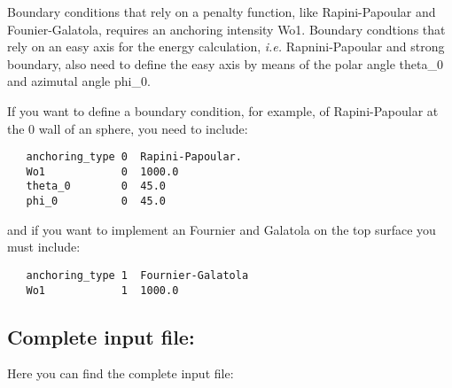 \documentclass{article}
\begin{document}
Boundary conditions that rely on a penalty function, like
  Rapini-Papoular and Founier-Galatola, requires an anchoring
intensity Wo1. Boundary condtions that rely on an easy axis for the
energy calculation, \textit{i.e.} Rapnini-Papoular and
  strong boundary, also need to define the easy axis by means of the
polar angle theta_0 and azimutal angle phi_0.

If you want to define a boundary condition, for example, of
Rapini-Papoular at the 0 wall of an sphere, you need to include:
\begin{lstlisting}
   anchoring_type 0  Rapini-Papoular.
   Wo1            0  1000.0
   theta_0        0  45.0
   phi_0          0  45.0	
\end{lstlisting}
and if you want to implement an Fournier and Galatola on the top
surface you must include:

\begin{lstlisting}
   anchoring_type 1  Fournier-Galatola
   Wo1            1  1000.0
\end{lstlisting}


\subsection{Complete input file:}

Here you can find the complete input file:
\end{document}
